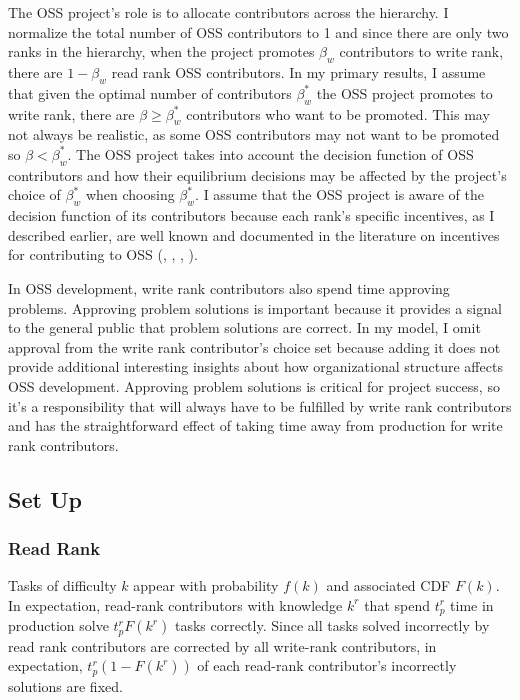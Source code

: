 \documentclass[source/paper/main.tex]{subfiles}
\begin{document}
\qquad The OSS project's role is to allocate contributors across the hierarchy. I normalize the total number of OSS contributors to 1 and since there are only two ranks in the hierarchy, when the project promotes $\beta_w$ contributors to write rank, there are $1 - \beta_w$ read rank OSS contributors. In my primary results, I assume that given the optimal number of contributors $\beta_w^*$ the OSS project promotes to write rank, there are $\beta \geq \beta_w^*$  contributors who want to be promoted. This may not always be realistic, as some OSS contributors may not want to be promoted so $\beta < \beta_w^*$. The OSS project takes into account the decision function of OSS contributors and how their equilibrium decisions may be affected by the project's choice of $\beta_w^*$ when choosing $\beta_w^*$. I assume that the OSS project is aware of the decision function of its contributors because each rank's specific incentives, as I described earlier, are well known and documented in the literature on incentives for contributing to OSS (\cite{lerner_simple_2002}, \cite{lakhani_how_2003}, \cite{von_krogh_community_2003}, \cite{robert_g_wolf_why_2003}). 

\qquad In OSS development, write rank contributors also spend time approving problems. Approving problem solutions is important because it provides a signal to the general public that problem solutions are correct. In my model, I omit approval from the write rank contributor's choice set because adding it does not provide additional interesting insights about how organizational structure affects OSS development. Approving problem solutions is critical for project success, so it's a responsibility that will always have to be fulfilled by write rank contributors and has the straightforward effect of taking time away from production for write rank contributors.

\subsection{Set Up}
\subsubsection{Read Rank}
Tasks of difficulty $k$ appear with probability $f(k)$ and associated CDF $F(k)$. In expectation, read-rank contributors with knowledge $k^r$ that spend $t_p^r$ time in production solve $t_p^r F(k^r)$ tasks correctly. Since all tasks solved incorrectly by read rank contributors are corrected by all write-rank contributors, in expectation, $t_p^r (1-F(k^r))$ of each read-rank contributor's incorrectly solutions are fixed. 
\end{document}
